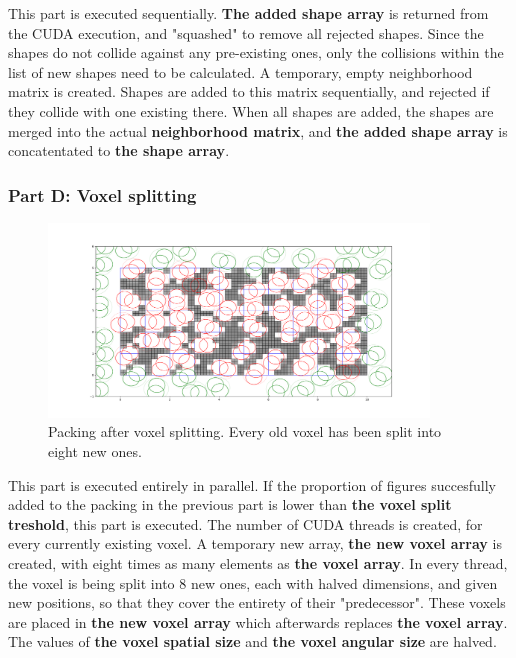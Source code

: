 \documentclass[12pt, oneside]{report}
\begin{document}
This part is executed sequentially. \newline
\textbf{The added shape array} is returned from the CUDA execution, and "squashed" to remove all rejected shapes. Since the shapes do not collide against any pre-existing ones, only the collisions within the list of new shapes need to be calculated. A temporary, empty neighborhood matrix is created. Shapes are added to this matrix sequentially, and rejected if they collide with one existing there. When all shapes are added, the shapes are merged into the actual \textbf{neighborhood matrix}, and \textbf{the added shape array} is concatentated to \textbf{the shape array}.

\subsubsection{Part D: Voxel splitting}

\begin{figure}[H]
  \centering
	\label{GPURSA_Process_5}
	\includegraphics[width=0.9\textwidth,keepaspectratio]{Images/GPURSA/Figure_5.pdf}
	\caption{Packing after voxel splitting. Every old voxel has been split into eight new ones.}
\end{figure}

This part is executed entirely in parallel. \newline
If the proportion of figures succesfully added to the packing in the previous part is lower than \textbf{the voxel split treshold}, this part is executed. \newline
The number of CUDA threads is created, for every currently existing voxel. A temporary new array, \textbf{the new voxel array} is created, with eight times as many elements as \textbf{the voxel array}. In every thread, the voxel is being split into 8 new ones, each with halved dimensions, and given new positions, so that they cover the entirety of their "predecessor". These voxels are placed in \textbf{the new voxel array} which afterwards replaces \textbf{the voxel array}.
The values of \textbf{the voxel spatial size} and \textbf{the voxel angular size} are halved.
\end{document}
